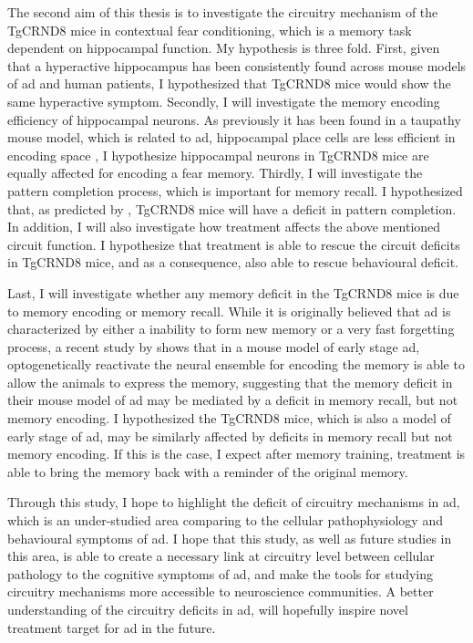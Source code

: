 The second aim of this thesis is to investigate the circuitry mechanism of the TgCRND8 mice in contextual fear conditioning, which is a memory task dependent on hippocampal function. My hypothesis is three fold. First, given that a hyperactive hippocampus has been consistently found across mouse models of \gls{ad} and human patients, I hypothesized that TgCRND8 mice would show the same hyperactive symptom. Secondly, I will investigate the memory encoding efficiency of hippocampal neurons. As previously it has been found in a taupathy mouse model, which is related to \gls{ad}, hippocampal place cells are less efficient in encoding space \citep{cheng13, ciupek15}, I hypothesize hippocampal neurons in TgCRND8 mice are equally affected for encoding a fear memory. Thirdly, I will investigate the pattern completion process, which is important for memory recall. I hypothesized that, as predicted by \citet{horn93}, TgCRND8 mice will have a deficit in pattern completion. In addition, I will also investigate how \tglu treatment affects the above mentioned circuit function. I hypothesize that \tglu treatment is able to rescue the circuit deficits in TgCRND8 mice, and as a consequence, also able to rescue behavioural deficit. 

Last, I will investigate whether any memory deficit in the TgCRND8 mice is due to memory encoding or memory recall. While it is originally believed that \gls{ad} is characterized by either a inability to form new memory or a very fast forgetting process, a recent study by \citet{roy16} shows that in a mouse model of early stage \gls{ad}, optogenetically reactivate the neural ensemble for encoding the memory is able to allow the animals to express the memory, suggesting that the memory deficit in their mouse model of \gls{ad} may be mediated by a deficit in memory recall, but not memory encoding. I hypothesized the TgCRND8 mice, which is also a model of early stage of \gls{ad}, may be similarly affected by deficits in memory recall but not memory encoding. If this is the case, I expect after memory training, \tglu treatment is able to bring the memory back with a reminder of the original memory.

Through this study, I hope to highlight the deficit of circuitry mechanisms in \gls{ad}, which is an under-studied area comparing to the cellular pathophysiology and behavioural symptoms of \gls{ad}. I hope that this study, as well as future studies in this area, is able to create a necessary link at circuitry level between cellular pathology to the cognitive symptoms of \gls{ad}, and make the tools for studying circuitry mechanisms more accessible to neuroscience communities. A better understanding of the circuitry deficits in \gls{ad}, will hopefully inspire novel treatment target for \gls{ad} in the future. 
